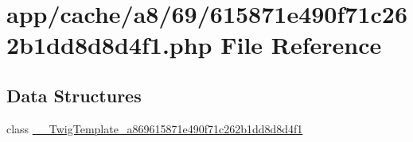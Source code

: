 \hypertarget{615871e490f71c262b1dd8d8d4f1_8php}{\section{app/cache/a8/69/615871e490f71c262b1dd8d8d4f1.php File Reference}
\label{615871e490f71c262b1dd8d8d4f1_8php}
}
\subsection*{Data Structures}
\begin{DoxyCompactItemize}
\item 
class \hyperlink{class_____twig_template__a869615871e490f71c262b1dd8d8d4f1}{\-\_\-\-\_\-\-Twig\-Template\-\_\-a869615871e490f71c262b1dd8d8d4f1}
\end{DoxyCompactItemize}
